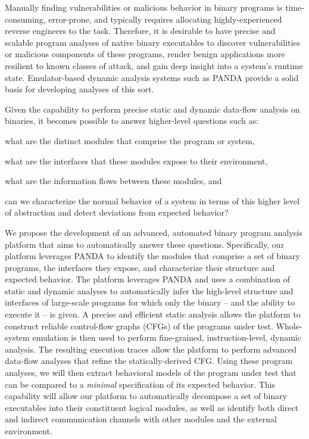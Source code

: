 \documentclass[letterpaper,twoside,11pt,headings=small]{scrartcl}
\newcommand{\dynamicsys}{\textsc{PANDA}\xspace}
\begin{document}
Manually finding vulnerabilities or malicious behavior in binary programs is
time-consuming, error-prone, and typically requires allocating
highly-experienced reverse engineers to the task. Therefore, it is desirable
to have precise and scalable program analyses of native binary executables to
discover vulnerabilities or malicious components of these programs, render
benign applications more resilient to known classes of attack, and gain deep
insight into a system's runtime state. Emulator-based dynamic analysis systems
such as \dynamicsys provide a solid basis for developing analyses of this
sort.

Given the capability to perform precise static and dynamic data-flow analysis
on binaries, it becomes possible to answer higher-level questions such as:%
\begin{inparaenum}
    \item what are the distinct modules that comprise the program or system,
    \item what are the interfaces that these modules expose to their environment,
    \item what are the information flows between these modules, and
    \item can we characterize the normal behavior of a system in terms of this higher
        level of abstraction and detect deviations from expected behavior?
\end{inparaenum}

We propose the development of an advanced, automated binary program analysis
platform that aims to automatically answer these questions.  Specifically, our
platform leverages \dynamicsys to identify the modules that comprise a set of
binary programs, the interfaces they expose, and characterize their structure
and expected behavior.  The platform leverages \dynamicsys and uses a
combination of static and dynamic analyses to automatically infer the
high-level structure and interfaces of large-scale programs for which only the
binary -- and the ability to execute it -- is given.  A precise and efficient
static analysis allows the platform to construct reliable control-flow graphs
(CFGs) of the programs under test.  Whole-system emulation is then used to
perform fine-grained, instruction-level, dynamic analysis.  The resulting
execution traces allow the platform to perform advanced data-flow analyses
that refine the statically-derived CFG.  Using these program analyses, we will
then extract behavioral models of the program under test that can be compared
to a \emph{minimal} specification of its expected behavior.  This capability
will allow our platform to automatically decompose a set of binary executables
into their constituent logical modules, as well as identify both direct and
indirect communication channels with other modules and the external
environment.
\end{document}
